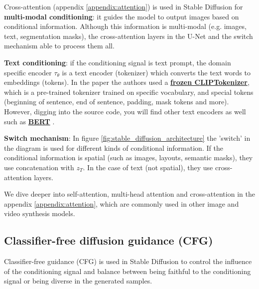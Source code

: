 Cross-attention (appendix \ref{appendix:attention}) is used in Stable Diffusion for \textbf{multi-modal conditioning}: it guides the model to output images based on conditional information. Although this information is multi-modal (e.g. images, text, segmentation masks), the cross-attention layers in the U-Net and the switch mechanism able to process them all.

\textbf{Text conditioning}: if the conditioning signal is text prompt, the domain specific encoder $\tau_\theta$ is a text encoder (tokenizer) which converts the text words to embeddings (tokens). In the paper \cite{stable_diffusion} the authors used a \href{https://github.com/CompVis/latent-diffusion/blob/a506df5756472e2ebaf9078affdde2c4f1502cd4/ldm/modules/encoders/modules.py#L138}{\textbf{frozen CLIPTokenizer}}, which is a pre-trained tokenizer trained on specific vocabulary, and special tokens (beginning of sentence, end of sentence, padding, mask tokens and more). However, digging into the source code, you will find other text encoders as well such as \href{https://github.com/CompVis/latent-diffusion/blame/a506df5756472e2ebaf9078affdde2c4f1502cd4/ldm/modules/encoders/modules.py#L53}{\textbf{BERT}} \cite{bert}.

\textbf{Switch mechanism}: In figure \ref{fig:stable_diffusion_architecture} the 'switch' in the diagram is used for different kinds of conditional information. If the conditional information is spatial (such as images, layouts, semantic masks), they use concatenation with $z_T$. In the case of text (not spatial), they use cross-attention layers. 

We dive deeper into self-attention, multi-head attention and cross-attention in the appendix \ref{appendix:attention}, which are commonly used in other image and video synthesis models.













\subsection{Classifier-free diffusion guidance (CFG)}

\label{subsec:classifier_free_diffusion_guidance}

Classifier-free guidance (CFG) is used in Stable Diffusion to control the influence of the conditioning signal and balance between being faithful to the conditioning signal or being diverse in the generated samples.

